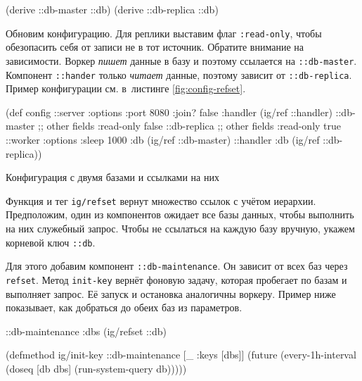 \begin{english}
  \begin{clojure}
(derive ::db-master ::db)
(derive ::db-replica ::db)
  \end{clojure}
\end{english}

Обновим конфигурацию. Для реплики выставим флаг \verb|:read-only|, чтобы
обезопасить себя от записи не в тот источник. Обратите внимание на
зависимости. Воркер \emph{пишет} данные в базу и поэтому ссылается на
\verb|::db-master|. Компонент \verb|::hander| только \emph{читает} данные,
поэтому зависит от \verb|::db-replica|. Пример конфигурации см. в~листинге
\ref{fig:config-refset}.

\begin{listing}[ht!]
  \small

\begin{english}
  \begin{clojure}
(def config
  {::server {:options {:port 8080 :join? false}
             :handler (ig/ref ::handler)}
   ::db-master {;; other fields
                :read-only false}
   ::db-replica {;; other fields
                 :read-only true}
   ::worker {:options {:sleep 1000}
             :db (ig/ref ::db-master)}
   ::handler {:db (ig/ref ::db-replica)}})
  \end{clojure}
\end{english}

\caption{Конфигурация с двумя базами и ссылками на них}
\label{fig:config-refset}

\end{listing}

Функция и тег \verb|ig/refset| вернут множество ссылок с учётом
иерархии. Предположим, один из компонентов ожидает все базы данных, чтобы
выполнить на них служебный запрос. Чтобы не ссылаться на каждую базу вручную,
укажем корневой ключ \verb|::db|.

Для этого добавим компонент \verb|::db-maintenance|. Он зависит от всех баз
через \verb|refset|. Метод \verb|init-key| вернёт фоновую задачу, которая
пробегает по базам и выполняет запрос. Её запуск и остановка аналогичны
воркеру. Пример ниже показывает, как добраться до обеих баз из параметров.

\begin{english}
  \begin{clojure}
{::db-maintenance {:dbs (ig/refset ::db)}}

(defmethod ig/init-key ::db-maintenance
  [_ {:keys [dbs]}]
  (future
    (every-1h-interval
      (doseq [db dbs]
        (run-system-query db)))))
  \end{clojure}
\end{english}

